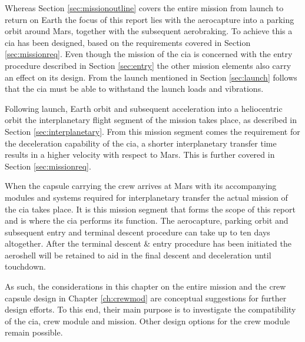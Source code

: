Whereas Section \ref{sec:missionoutline} covers the entire mission from launch to return on Earth the focus of this report lies with the aerocapture into a parking orbit around Mars, together with the subsequent aerobraking. To achieve this a \gls{cia} has been designed, based on the requirements covered in Section \ref{sec:missionreq}. Even though the mission of the \gls{cia} is concerned with the entry procedure described in Section \ref{sec:entry} the other mission elements also carry an effect on its design. From the launch mentioned in Section \ref{sec:launch} follows that the \gls{cia} must be able to withstand the launch loads and vibrations. 

Following launch, Earth orbit and subsequent acceleration into a heliocentric orbit the interplanetary flight segment of the mission takes place, as described in Section \ref{sec:interplanetary}. From this mission segment comes the requirement for the deceleration capability of the \gls{cia}, a shorter interplanetary transfer time results in a higher velocity with respect to Mars. This is further covered in Section \ref{sec:missionreq}. 

When the capsule carrying the crew arrives at Mars with its accompanying modules and systems required for interplanetary transfer the actual mission of the \gls{cia} takes place. It is this mission segment that forms the scope of this report and is where the \gls{cia} performs its function. The aerocapture, parking orbit and subsequent entry and terminal descent procedure can take up to ten days altogether. After the terminal descent \& entry procedure has been initiated the aeroshell will be retained to aid in the final descent and deceleration until touchdown.

As such, the considerations in this chapter on the entire mission and the crew capsule design in Chapter \ref{ch:crewmod} are conceptual suggestions for further design efforts. To this end, their main purpose is to investigate the compatibility of the \gls{cia}, crew module and mission. Other design options for the crew module remain possible.